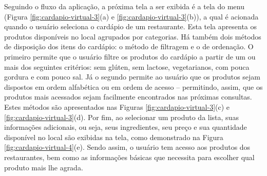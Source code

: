 Seguindo o fluxo da aplicação, a próxima tela a ser exibida é a tela do menu (Figura \ref{fig:cardapio-virtual-3}(a) e \ref{fig:cardapio-virtual-3}(b)), a qual é acionada quando o usuário seleciona o cardápio de um restaurante. Esta tela apresenta os produtos disponíveis no local agrupados por categorias. Há também dois métodos de disposição dos itens do cardápio: o método de filtragem e o de ordenação. O primeiro permite que o usuário filtre os produtos do cardápio a partir de um ou mais dos seguintes critérios: sem glúten, sem lactose, vegetarianos, com pouca gordura e com pouco sal. Já o segundo permite ao usuário que os produtos sejam dispostos em ordem alfabética ou em ordem de acesso -- permitindo, assim, que os produtos mais acessados sejam facilmente encontrados nas próximas consultas. Estes métodos são apresentados nas Figuras \ref{fig:cardapio-virtual-3}(c) e \ref{fig:cardapio-virtual-3}(d). Por fim, ao selecionar um produto da lista, suas informações adicionais, ou seja, seus ingredientes, seu preço e sua quantidade disponível no local são exibidas na tela, como demonstrado na Figura \ref{fig:cardapio-virtual-4}(e). Sendo assim, o usuário tem acesso aos produtos dos restaurantes, bem como as informações básicas que necessita para escolher qual produto mais lhe agrada.

